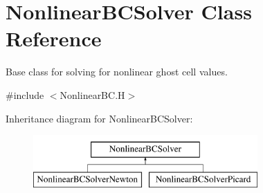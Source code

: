 \hypertarget{class_nonlinear_b_c_solver}{}\section{Nonlinear\+B\+C\+Solver Class Reference}
\label{class_nonlinear_b_c_solver}


Base class for solving for nonlinear ghost cell values.  




{\ttfamily \#include $<$Nonlinear\+B\+C.\+H$>$}

Inheritance diagram for Nonlinear\+B\+C\+Solver\+:\begin{figure}[H]
\begin{center}
\leavevmode
\includegraphics[height=2.000000cm]{class_nonlinear_b_c_solver}
\end{center}
\end{figure}
